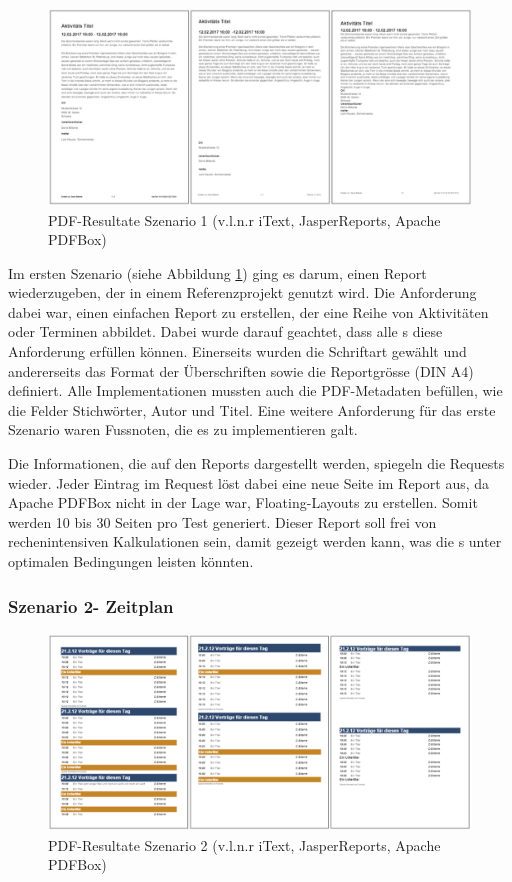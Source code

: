 \documentclass[main.tex]{subfiles}
\begin{document}
\begin{figure}[h]
\includegraphics[width=\textwidth]{mainpart/3_methodik_evaluation_img/Szenario1PDF.PNG}
 \caption{PDF-Resultate Szenario 1 (v.l.n.r iText, JasperReports, Apache PDFBox)}
 \label{figure:PDFResultSzen1}
\end{figure}


Im ersten Szenario (siehe Abbildung \ref{figure:PDFResultSzen1}) ging es darum, einen Report wiederzugeben, der in einem Referenzprojekt genutzt wird. Die Anforderung dabei war, einen einfachen Report zu erstellen, der eine Reihe von Aktivitäten oder Terminen abbildet. Dabei wurde darauf geachtet, dass alle s diese Anforderung erfüllen können. Einerseits wurden die Schriftart gewählt und andererseits das Format der Überschriften sowie die Reportgrösse (DIN A4) definiert. Alle Implementationen mussten auch die PDF-Metadaten befüllen, wie die Felder Stichwörter, Autor und Titel. Eine weitere Anforderung für das erste Szenario waren Fussnoten, die es zu implementieren galt.

Die Informationen, die auf den Reports dargestellt werden, spiegeln die Requests wieder. Jeder Eintrag im Request löst dabei eine neue Seite im Report aus, da Apache PDFBox nicht in der Lage war, Floating-Layouts zu erstellen. Somit werden 10 bis 30 Seiten pro Test generiert. Dieser Report soll frei von rechenintensiven Kalkulationen sein, damit gezeigt werden kann, was die s unter optimalen Bedingungen leisten könnten.
 


\subsubsection{Szenario 2- Zeitplan}
\begin{figure}[h]
\includegraphics[width=\textwidth]{mainpart/3_methodik_evaluation_img/Szenario2PDF.PNG}
 \caption{PDF-Resultate Szenario 2 (v.l.n.r iText, JasperReports, Apache PDFBox)}
 \label{figure:PDFResultSzen2}
\end{figure}
\end{document}

